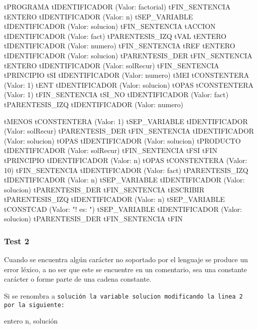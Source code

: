 \noindent\begin{minipage}{.45\textwidth}
\begin{codigo}
tPROGRAMA
tIDENTIFICADOR (Valor: factorial)
tFIN_SENTENCIA
tENTERO
tIDENTIFICADOR (Valor: n)
tSEP_VARIABLE
tIDENTIFICADOR (Valor: solucion)
tFIN_SENTENCIA
tACCION
tIDENTIFICADOR (Valor: fact)
tPARENTESIS_IZQ
tVAL
tENTERO
tIDENTIFICADOR (Valor: numero)
tFIN_SENTENCIA
tREF
tENTERO
tIDENTIFICADOR (Valor: solucion)
tPARENTESIS_DER
tFIN_SENTENCIA
tENTERO
tIDENTIFICADOR (Valor: solRecur)
tFIN_SENTENCIA
tPRINCIPIO
tSI
tIDENTIFICADOR (Valor: numero)
tMEI
tCONSTENTERA (Valor: 1)
tENT
tIDENTIFICADOR (Valor: solucion)
tOPAS
tCONSTENTERA (Valor: 1)
tFIN_SENTENCIA
tSI_NO
tIDENTIFICADOR (Valor: fact)
tPARENTESIS_IZQ
tIDENTIFICADOR (Valor: numero)
\end{codigo}
\end{minipage}\hfill
\begin{minipage}{.45\textwidth}
\begin{codigo}
tMENOS
tCONSTENTERA (Valor: 1)
tSEP_VARIABLE
tIDENTIFICADOR (Valor: solRecur)
tPARENTESIS_DER
tFIN_SENTENCIA
tIDENTIFICADOR (Valor: solucion)
tOPAS
tIDENTIFICADOR (Valor: solucion)
tPRODUCTO
tIDENTIFICADOR (Valor: solRecur)
tFIN_SENTENCIA
tFSI
tFIN
tPRINCIPIO
tIDENTIFICADOR (Valor: n)
tOPAS
tCONSTENTERA (Valor: 10)
tFIN_SENTENCIA
tIDENTIFICADOR (Valor: fact)
tPARENTESIS_IZQ
tIDENTIFICADOR (Valor: n)
tSEP_VARIABLE
tIDENTIFICADOR (Valor: solucion)
tPARENTESIS_DER
tFIN_SENTENCIA
tESCRIBIR
tPARENTESIS_IZQ
tIDENTIFICADOR (Valor: n)
tSEP_VARIABLE
tCONSTCAD (Valor: "! es: ")
tSEP_VARIABLE
tIDENTIFICADOR (Valor: solucion)
tPARENTESIS_DER
tFIN_SENTENCIA
tFIN
\end{codigo}
\end{minipage}

\begin{codigo}
\end{codigo}

\subsubsection{Test 2}
Cuando se encuentra algún carácter no soportado por el lenguaje se produce un error léxico, a no ser que este se encuentre en un comentario, sea una constante carácter o forme parte de una cadena constante.

Si se renombra a \tt{solución} la variable \tt{solucion} modificando la linea 2 por la siguiente:

\begin{codigo}[style=minileng]
entero n, solución
\end{codigo}

